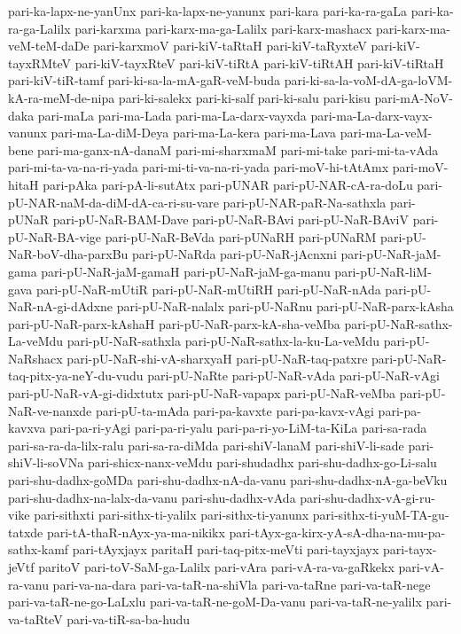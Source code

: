 {pari-ka-lapx-ne-yanUnx
pari-ka-lapx-ne-yanunx
pari-kara
pari-ka-ra-gaLa
pari-ka-ra-ga-Lalilx
pari-karxma
pari-karx-ma-ga-Lalilx
pari-karx-mashacx
pari-karx-ma-veM-teM-daDe
pari-karxmoV
pari-kiV-taRtaH
pari-kiV-taRyxteV
pari-kiV-tayxRMteV
pari-kiV-tayxRteV
pari-kiV-tiRtA
pari-kiV-tiRtAH
pari-kiV-tiRtaH
pari-kiV-tiR-tamf
pari-ki-sa-la-mA-gaR-veM-buda
pari-ki-sa-la-voM-dA-ga-loVM-kA-ra-meM-de-nipa
pari-ki-salekx
pari-ki-salf
pari-ki-salu
pari-kisu
pari-mA-NoV-daka
pari-maLa
pari-ma-Lada
pari-ma-La-darx-vayxda
pari-ma-La-darx-vayx-vanunx
pari-ma-La-diM-Deya
pari-ma-La-kera
pari-ma-Lava
pari-ma-La-veM-bene
pari-ma-ganx-nA-danaM
pari-mi-sharxmaM
pari-mi-take
pari-mi-ta-vAda
pari-mi-ta-va-na-ri-yada
pari-mi-ti-va-na-ri-yada
pari-moV-hi-tAtAmx
pari-moV-hitaH
pari-pAka
pari-pA-li-sutAtx
pari-pUNAR
pari-pU-NAR-cA-ra-doLu
pari-pU-NAR-naM-da-diM-dA-ca-ri-su-vare
pari-pU-NAR-paR-Na-sathxla
pari-pUNaR
pari-pU-NaR-BAM-Dave
pari-pU-NaR-BAvi
pari-pU-NaR-BAviV
pari-pU-NaR-BA-vige
pari-pU-NaR-BeVda
pari-pUNaRH
pari-pUNaRM
pari-pU-NaR-boV-dha-parxBu
pari-pU-NaRda
pari-pU-NaR-jAcnxni
pari-pU-NaR-jaM-gama
pari-pU-NaR-jaM-gamaH
pari-pU-NaR-jaM-ga-manu
pari-pU-NaR-liM-gava
pari-pU-NaR-mUtiR
pari-pU-NaR-mUtiRH
pari-pU-NaR-nAda
pari-pU-NaR-nA-gi-dAdxne
pari-pU-NaR-nalalx
pari-pU-NaRnu
pari-pU-NaR-parx-kAsha
pari-pU-NaR-parx-kAshaH
pari-pU-NaR-parx-kA-sha-veMba
pari-pU-NaR-sathx-La-veMdu
pari-pU-NaR-sathxla
pari-pU-NaR-sathx-la-ku-La-veMdu
pari-pU-NaRshacx
pari-pU-NaR-shi-vA-sharxyaH
pari-pU-NaR-taq-patxre
pari-pU-NaR-taq-pitx-ya-neY-du-vudu
pari-pU-NaRte
pari-pU-NaR-vAda
pari-pU-NaR-vAgi
pari-pU-NaR-vA-gi-didxtutx
pari-pU-NaR-vapapx
pari-pU-NaR-veMba
pari-pU-NaR-ve-nanxde
pari-pU-ta-mAda
pari-pa-kavxte
pari-pa-kavx-vAgi
pari-pa-kavxva
pari-pa-ri-yAgi
pari-pa-ri-yalu
pari-pa-ri-yo-LiM-ta-KiLa
pari-sa-rada
pari-sa-ra-da-lilx-ralu
pari-sa-ra-diMda
pari-shiV-lanaM
pari-shiV-li-sade
pari-shiV-li-soVNa
pari-shicx-nanx-veMdu
pari-shudadhx
pari-shu-dadhx-go-Li-salu
pari-shu-dadhx-goMDa
pari-shu-dadhx-nA-da-vanu
pari-shu-dadhx-nA-ga-beVku
pari-shu-dadhx-na-lalx-da-vanu
pari-shu-dadhx-vAda
pari-shu-dadhx-vA-gi-ru-vike
pari-sithxti
pari-sithx-ti-yalilx
pari-sithx-ti-yanunx
pari-sithx-ti-yuM-TA-gu-tatxde
pari-tA-thaR-nAyx-ya-ma-nikikx
pari-tAyx-ga-kirx-yA-sA-dha-na-mu-pa-sathx-kamf
pari-tAyxjayx
paritaH
pari-taq-pitx-meVti
pari-tayxjayx
pari-tayx-jeVtf
paritoV
pari-toV-SaM-ga-Lalilx
pari-vAra
pari-vA-ra-va-gaRkekx
pari-vA-ra-vanu
pari-va-na-dara
pari-va-taR-na-shiVla
pari-va-taRne
pari-va-taR-nege
pari-va-taR-ne-go-LaLxlu
pari-va-taR-ne-goM-Da-vanu
pari-va-taR-ne-yalilx
pari-va-taRteV
pari-va-tiR-sa-ba-hudu
}
